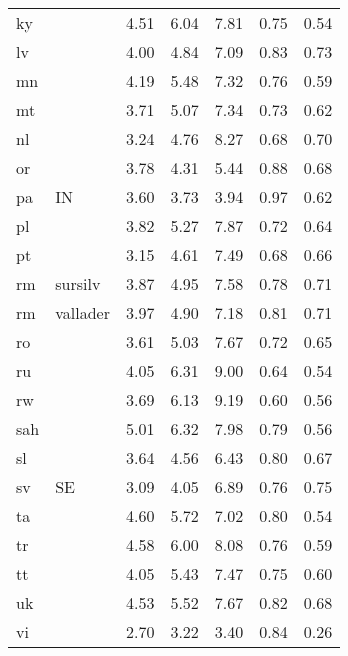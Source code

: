\begin{table}[H]
\begin{tabular}{llrrrrr}
  ky &  & 4.51 & 6.04 & 7.81 & 0.75 & 0.54 \\ 
  lv &  & 4.00 & 4.84 & 7.09 & 0.83 & 0.73 \\ 
  mn &  & 4.19 & 5.48 & 7.32 & 0.76 & 0.59 \\ 
  mt &  & 3.71 & 5.07 & 7.34 & 0.73 & 0.62 \\ 
  nl &  & 3.24 & 4.76 & 8.27 & 0.68 & 0.70 \\ 
  or &  & 3.78 & 4.31 & 5.44 & 0.88 & 0.68 \\ 
  pa & IN & 3.60 & 3.73 & 3.94 & 0.97 & 0.62 \\ 
  pl &  & 3.82 & 5.27 & 7.87 & 0.72 & 0.64 \\ 
  pt &  & 3.15 & 4.61 & 7.49 & 0.68 & 0.66 \\ 
  rm & sursilv & 3.87 & 4.95 & 7.58 & 0.78 & 0.71 \\ 
  rm & vallader & 3.97 & 4.90 & 7.18 & 0.81 & 0.71 \\ 
  ro &  & 3.61 & 5.03 & 7.67 & 0.72 & 0.65 \\ 
  ru &  & 4.05 & 6.31 & 9.00 & 0.64 & 0.54 \\ 
  rw &  & 3.69 & 6.13 & 9.19 & 0.60 & 0.56 \\ 
  sah &  & 5.01 & 6.32 & 7.98 & 0.79 & 0.56 \\ 
  sl &  & 3.64 & 4.56 & 6.43 & 0.80 & 0.67 \\ 
  sv & SE & 3.09 & 4.05 & 6.89 & 0.76 & 0.75 \\ 
  ta &  & 4.60 & 5.72 & 7.02 & 0.80 & 0.54 \\ 
  tr &  & 4.58 & 6.00 & 8.08 & 0.76 & 0.59 \\ 
  tt &  & 4.05 & 5.43 & 7.47 & 0.75 & 0.60 \\ 
  uk &  & 4.53 & 5.52 & 7.67 & 0.82 & 0.68 \\ 
  vi &  & 2.70 & 3.22 & 3.40 & 0.84 & 0.26 \\ 
   \hline
\end{tabular}
\end{table}
